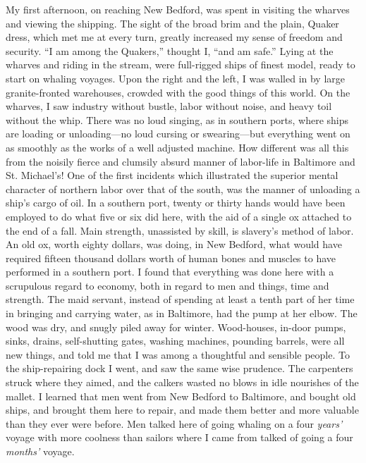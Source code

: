 My first afternoon, on reaching New Bedford, was spent in visiting the
wharves and viewing the shipping. The sight of the broad brim and the
plain, Quaker dress, which met me at every turn, greatly increased my
sense of freedom and security. ``I am among the Quakers,'' thought I,
``and am safe.'' Lying at the wharves and riding in the stream, were
full-rigged ships of finest model, ready to start on whaling voyages.
Upon the right and the left, I was walled in by large granite-fronted
warehouses, crowded with the good things of this world. On the wharves,
I saw industry without bustle, labor without noise, and heavy toil
without the whip. There was no loud singing, as in southern ports, where
ships are loading or unloading---no loud cursing or swearing---but
everything went on as smoothly as the works of a well adjusted machine.
How different was all this from the noisily fierce and clumsily absurd
manner of labor-life in Baltimore and St. Michael's! One of the first
incidents which illustrated the superior mental character of northern
labor over that of the south, was the manner of unloading a ship's cargo
of oil. In a southern port, twenty or thirty hands would have been
employed to do what five or six did here, with the aid of a single ox
attached to the end of a fall. Main strength, unassisted by skill, is
slavery's method of labor. An old ox, worth eighty dollars, was doing,
in New Bedford, what would have required fifteen thousand dollars
{\protect\hypertarget{346}{}{}}worth of human bones and muscles to have
performed in a southern port. I found that everything was done here with
a scrupulous regard to economy, both in regard to men and things, time
and strength. The maid servant, instead of spending at least a tenth
part of her time in bringing and carrying water, as in Baltimore, had
the pump at her elbow. The wood was dry, and snugly piled away for
winter. Wood-houses, in-door pumps, sinks, drains, self-shutting gates,
washing machines, pounding barrels, were all new things, and told me
that I was among a thoughtful and sensible people. To the ship-repairing
dock I went, and saw the same wise prudence. The carpenters struck where
they aimed, and the calkers wasted no blows in idle nourishes of the
mallet. I learned that men went from New Bedford to Baltimore, and
bought old ships, and brought them here to repair, and made them better
and more valuable than they ever were before. Men talked here of going
whaling on a four \emph{years{'}} voyage with more coolness than sailors
where I came from talked of going a four \emph{months{'}} voyage.

